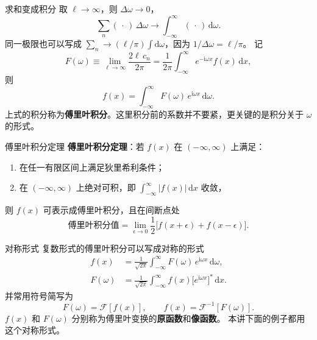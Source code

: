 \documentclass[fontset=windows, chinese, 10pt, xcolor=dvipsnames]{beamer}
\begin{document}
\begin{frame}{求和变成积分}
  取 $\ell\to\infty$，则 $\Delta\omega\to 0$，
  \begin{equation*}
    \sum_n(\,\cdot\,)\,\Delta\omega
    \longrightarrow\int_{-\infty}^{\infty}(\,\cdot\,)\,\mathrm{d}\omega.
  \end{equation*}
  同一极限也可以写成 $\sum_n\to(\ell/\pi)\int\mathrm{d}\omega$，因为 $1/\Delta\omega=\ell/\pi$。
  记
  \begin{equation*}
    F(\omega)
    \equiv\lim_{\ell\to\infty}\frac{2\ell\,c_n}{2\pi}
    =\frac{1}{2\pi}\int_{-\infty}^{\infty}
      e^{-\mathrm{i}\omega x}f(x)\,\mathrm{d}x,
  \end{equation*}
  则
  \begin{equation*}
    f(x)=\int_{-\infty}^{\infty}
      F(\omega)\,e^{\mathrm{i}\omega x}\,\mathrm{d}\omega.
  \end{equation*}
  上式的积分称为\textbf{傅里叶积分}。这里积分前的系数并不要紧，更关键的是积分关于 $\omega$ 的形式。
\end{frame}

\begin{frame}{傅里叶积分定理}
  \textbf{傅里叶积分定理}：若 $f(x)$ 在 $(-\infty,\infty)$ 上满足：
  \begin{enumerate}
    \item 在任一有限区间上满足狄里希利条件；
    \item 在 $(-\infty,\infty)$ 上绝对可积，即 $\displaystyle\int_{-\infty}^{\infty}|f(x)|\,\mathrm{d}x$ 收敛，
  \end{enumerate}
  则 $f(x)$ 可表示成傅里叶积分，且在间断点处
  \begin{equation*}
    \text{傅里叶积分值}
    =\lim_{\epsilon\to 0}\frac12
      \bigl[f(x+\epsilon)+f(x-\epsilon)\bigr].
  \end{equation*}
\end{frame}

\begin{frame}{对称形式}
  复数形式的傅里叶积分可以写成对称的形式
  \begin{equation*}
    \begin{aligned}
      f(x)&=\frac{1}{\sqrt{2\pi}}\int_{-\infty}^{\infty}
        F(\omega)\,e^{\mathrm{i}\omega x}\,\mathrm{d}\omega,\\
      F(\omega)&=\frac{1}{\sqrt{2\pi}}\int_{-\infty}^{\infty}
        f(x)\bigl[e^{\mathrm{i}\omega x}\bigr]^*\,\mathrm{d}x.
    \end{aligned}
  \end{equation*}
  并常用符号简写为
  \begin{equation*}
    F(\omega)=\mathcal{F}[f(x)],
    \qquad
    f(x)=\mathcal{F}^{-1}[F(\omega)].
  \end{equation*}
  $f(x)$ 和 $F(\omega)$ 分别称为傅里叶变换的\textbf{原函数}和\textbf{像函数}。
  本讲下面的例子都用这个对称形式。
\end{frame}
\end{document}
